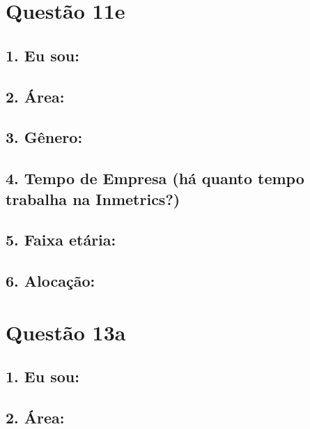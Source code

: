 \documentclass[]{book}
\begin{document}
\hypertarget{questao-11e}{%
\section{Questão 11e}\label{questao-11e}}

\hypertarget{eu-sou-16}{%
\subsection{1. Eu sou:}\label{eu-sou-16}}

\hypertarget{area-16}{%
\subsection{2. Área:}\label{area-16}}

\hypertarget{genero-16}{%
\subsection{3. Gênero:}\label{genero-16}}

\hypertarget{tempo-de-empresa-ha-quanto-tempo-trabalha-na-inmetrics-16}{%
\subsection{4. Tempo de Empresa (há quanto tempo trabalha na Inmetrics?)}\label{tempo-de-empresa-ha-quanto-tempo-trabalha-na-inmetrics-16}}

\hypertarget{faixa-etaria-16}{%
\subsection{5. Faixa etária:}\label{faixa-etaria-16}}

\hypertarget{alocacao-16}{%
\subsection{6. Alocação:}\label{alocacao-16}}

\hypertarget{questao-13a}{%
\section{Questão 13a}\label{questao-13a}}

\hypertarget{eu-sou-17}{%
\subsection{1. Eu sou:}\label{eu-sou-17}}

\hypertarget{area-17}{%
\subsection{2. Área:}\label{area-17}}
\end{document}
